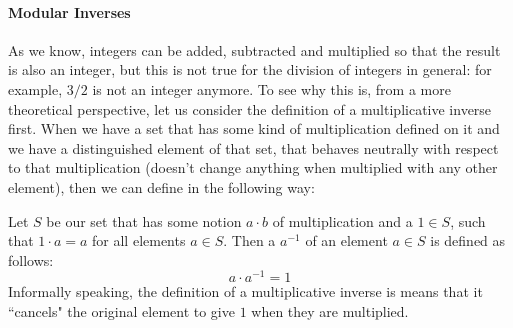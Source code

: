 \paragraph{Modular Inverses} 
As we know, integers can be added, subtracted and multiplied so that the result is also an integer, but this is not true for the division of integers in general: for example, $3/2$ is not an integer anymore. To see why this is, from a more theoretical perspective, let us consider the definition of a multiplicative inverse first. When we have a set that has some kind of multiplication defined on it and we have a distinguished element of that set, that behaves neutrally with respect to that multiplication (doesn't change anything when multiplied with any other element), then we can define  in the following way:

Let $S$ be our set that has some notion $a\cdot b$ of multiplication and a  $1\in S$, such that $1\cdot a = a$ for all elements $a\in S$. Then a  $a^{-1}$ of an element $a\in S$ is defined as follows:
\begin{equation}
a\cdot a^{-1} = 1
\end{equation}
Informally speaking, the definition of a multiplicative inverse is means that it ``cancels" the original element to give $1$ when they are multiplied. 

